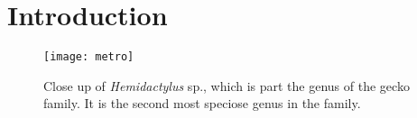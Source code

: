 \documentclass[12pt,]{article}
\newcommand{\species}[1]{\textit{#1} sp.}
\begin{document}
\listoffigures
\section{Introduction}

\begin{figure}
	\centering
	\texttt{[image: metro]}
	\caption[Close up of \species{Hemidactylus}]
	{Close up of \species{Hemidactylus}, which is part the genus of the gecko family. It is the second most speciose genus in the family.}
\end{figure}
\end{document}
